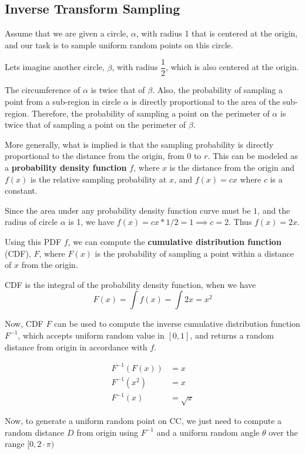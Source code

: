 \subsection{Inverse Transform Sampling}
Assume that we are given a circle, $\alpha$, with radius 1 that is centered at the origin, and our task is to sample uniform random points on this circle.

Lets imagine another circle, $\beta$, with radius $\dfrac{1}{2}$, which is also centered at the origin.

The circumference of $\alpha$ is twice that of $\beta$. Also, the probability of sampling a point from a sub-region in circle $\alpha$ is directly proportional to the area of the sub-region. Therefore, the probability of sampling a point on the perimeter of $\alpha$ is twice that of sampling a point on the perimeter of $\beta$.

More generally, what is implied is that the sampling probability is directly proportional to the distance from the origin, from $0$ to $r$. This can be modeled as a \textbf{probability density function} $f$, where $x$ is the distance from the origin and $f(x)$ is the relative sampling probability at $x$, and $f(x)=cx$ where $c$ is a constant.

Since the area under any probability density function curve must be $1$, and the radius of circle $\alpha$ is 1, we have $ f(x) = cx* 1/2=1 \implies c=2$. Thus $f(x)=2x$.

Using this PDF $f$, we can compute the \textbf{cumulative distribution function} (CDF), $F$, where $F(x)$ is the probability of sampling a point within a distance of $x$ from the origin.

CDF is the integral of the probability density function, when we have
\[
F(x) = \int{f(x)} = \int{2x} = x^2
\]

Now, CDF $F$ can be used to compute the inverse cumulative distribution function $F^{-1}$, which accepts uniform random value in $[0,1]$, and returns a random distance from origin in accordance with $f$.
 
\begin{align*}
F^{-1}\left(F(x)\right) &= x \\
F^{-1}\left(x^2\right) &= x\\
F^{-1}(x) &= \sqrt{x}
\end{align*}

Now, to generate a uniform random point on CC, we just need to compute a random distance $D$ from origin using $F^{-1}$  and a uniform random angle $\theta$ over the range $[0, 2\cdot \pi)$

